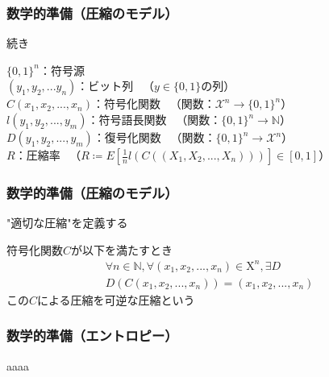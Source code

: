 \documentclass{classes/myslide}
\begin{document}
\begin{frame}\frametitle{数学的準備（圧縮のモデル）}
  続き
  \begin{definition}[]
    $\{0, 1\}^n$：符号源 \\
    $(y_1, y_2,... y_n)$：ビット列 \ （$y \in \{0, 1\}$の列）\\
    $C(x_1, x_2, ..., x_n )$：符号化関数 \ （関数：$\mathcal{X}^n \rightarrow \{0, 1\}^n$）\\
    $l(y_1, y_2, ..., y_m )$：符号語長関数 \ （関数：$\{0, 1\}^n \rightarrow \mathbb{N}$） \\
    $D(y_1, y_2, ..., y_m )$：復号化関数  \ （関数：$\{0, 1\}^n \rightarrow \mathcal{X}^n$） \\
    $R$：圧縮率 \ （$R \coloneq E[\frac{1}{n}l(C((X_1, X_2, ..., X_n)))] \in [0, 1]$）
  \end{definition}
\end{frame}

\begin{frame}\frametitle{数学的準備（圧縮のモデル）}
  "適切な圧縮"を定義する
  \begin{definition}[]
    符号化関数$C$が以下を満たすとき
    \begin{multline*}
      \forall n \in \mathbb{N}, \forall (x_1, x_2, ..., x_n ) \in \mathrm{X}^n, \exists D \\ D(C(x_1, x_2, ..., x_n )) = (x_1, x_2, ..., x_n )
    \end{multline*}
    この$C$による圧縮を可逆な圧縮という
  \end{definition}
\end{frame}

\begin{frame}\frametitle{数学的準備（エントロピー）}
  aaaa
\end{frame}
\end{document}
